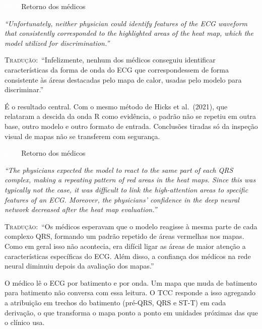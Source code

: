 \documentclass[11pt,a4paper]{article}
\newcommand{\pagechip}[1]{{\setlength{\fboxsep}{1.5pt}\colorbox{cAcc}{\textcolor{white}{\scriptsize\texttt{#1}}}}}
\newenvironment{origquote}{\par\itshape\small}{\par}
\newenvironment{tradquote}{\par\small\textsc{Tradução:}\ }{\par}
\newcommand{\explab}[1]{\par\smallskip{\small\color{cAcc}\textbf{\MakeUppercase{#1}}}\par}
\begin{document}
\begin{citacard}{\pagechip{§3.3} Retorno dos médicos}
\begin{origquote}“Unfortunately, neither physician could identify features of the ECG waveform that consistently corresponded to the highlighted areas of the heat map, which the model utilized for discrimination.”\end{origquote}
\begin{tradquote}“Infelizmente, nenhum dos médicos conseguiu identificar características da forma de onda do ECG que correspondessem de forma consistente às áreas destacadas pelo mapa de calor, usadas pelo modelo para discriminar.”\end{tradquote}
\explab{Explicação}
É o resultado central. Com o mesmo método de Hicks et al.\ (2021), que relataram a descida da onda R como evidência, o padrão não se repetiu em outra base, outro modelo e outro formato de entrada. Conclusões tiradas só da inspeção visual de mapas não se transferem com segurança.
\end{citacard}

\begin{citacard}{\pagechip{§3.3} Retorno dos médicos}
\begin{origquote}“The physicians expected the model to react to the same part of each QRS complex, making a repeating pattern of red areas in the heat maps. Since this was typically not the case, it was difficult to link the high-attention areas to specific features of an ECG. Moreover, the physicians’ confidence in the deep neural network decreased after the heat map evaluation.”\end{origquote}
\begin{tradquote}“Os médicos esperavam que o modelo reagisse à mesma parte de cada complexo QRS, formando um padrão repetido de áreas vermelhas nos mapas. Como em geral isso não acontecia, era difícil ligar as áreas de maior atenção a características específicas do ECG. Além disso, a confiança dos médicos na rede neural diminuiu depois da avaliação dos mapas.”\end{tradquote}
\explab{Explicação}
O médico lê o ECG por batimento e por onda. Um mapa que muda de batimento para batimento não conversa com essa leitura. O TCC responde a isso agregando a atribuição em trechos do batimento (pré-QRS, QRS e ST-T) em cada derivação, o que transforma o mapa ponto a ponto em unidades próximas das que o clínico usa.
\end{citacard}
\end{document}
